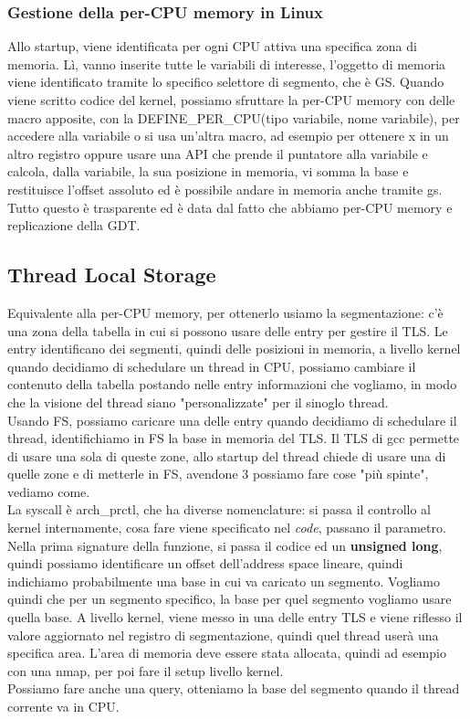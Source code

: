 \documentclass[12pt, oneside]{extbook}
\begin{document}
\subsubsection{Gestione della per-CPU memory in Linux}
Allo startup, viene identificata per ogni CPU attiva una specifica zona di memoria. Lì, vanno inserite tutte le variabili di interesse, l'oggetto di memoria viene identificato tramite lo specifico selettore di segmento, che è GS. Quando viene scritto codice del kernel, possiamo sfruttare la per-CPU memory con delle macro apposite, con la \textsf{DEFINE\_PER\_CPU(tipo variabile, nome variabile)}, per accedere alla variabile o si usa un'altra macro, ad esempio per ottenere x in un altro registro oppure usare una API che prende il puntatore alla variabile e calcola, dalla variabile, la sua posizione in memoria, vi somma la base e restituisce l'offset assoluto ed è possibile andare in memoria anche tramite gs. Tutto questo è trasparente ed è data dal fatto che abbiamo per-CPU memory e replicazione della GDT.
\subsection{Thread Local Storage}
Equivalente alla per-CPU memory, per ottenerlo usiamo la segmentazione: c'è una zona della tabella in cui si possono usare delle entry per gestire il TLS. Le entry identificano dei segmenti, quindi delle posizioni in memoria, a livello kernel quando decidiamo di schedulare un thread in CPU, possiamo cambiare il contenuto della tabella postando nelle entry informazioni che vogliamo, in modo che la visione del thread siano "personalizzate" per il sinoglo thread.\\ Usando FS, possiamo caricare una delle entry quando decidiamo di schedulare il thread, identifichiamo in FS la base in memoria del TLS. Il TLS di gcc permette di usare una sola di queste zone, allo startup del thread chiede di usare una di quelle zone e di metterle in FS, avendone 3 possiamo fare cose "più spinte", vediamo come.\\ La syscall è \textsf{arch\_prctl}, che ha diverse nomenclature: si passa il controllo al kernel internamente, cosa fare viene specificato nel \textit{code}, passano il parametro.\\ Nella prima signature della funzione, si passa il codice ed un \textbf{unsigned long}, quindi possiamo identificare un offset dell'address space lineare, quindi indichiamo probabilmente una base in cui va caricato un segmento. Vogliamo quindi che per un segmento specifico, la base per quel segmento vogliamo usare quella base. A livello kernel, viene messo in una delle entry TLS e viene riflesso il valore aggiornato nel registro di segmentazione, quindi quel thread userà una specifica area. L'area di memoria deve essere stata allocata, quindi ad esempio con una nmap, per poi fare il setup livello kernel.\\ Possiamo fare anche una query, otteniamo la base del segmento quando il thread corrente va in CPU.
\end{document}
